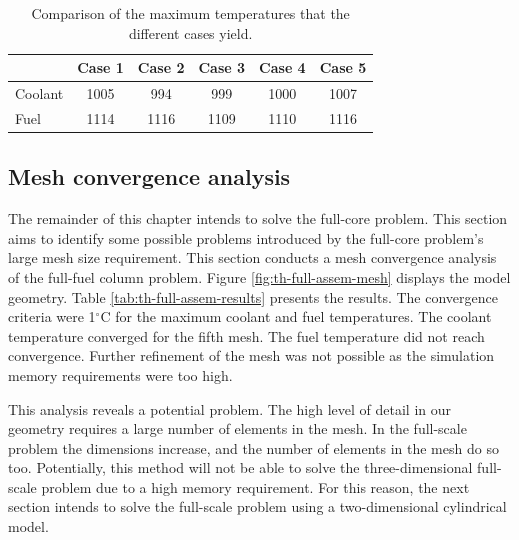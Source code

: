 \begin{table}[htbp!]
  \centering
  \caption{Comparison of the maximum temperatures that the different cases yield.}
  \label{tab:th-assem-flow-results}
\begin{tabular}{l|ccccc}
\toprule
        & Case 1 & Case 2 & Case 3 & Case 4 & Case 5 \\
\midrule
Coolant & 1005   &  994   &  999 & 1000 & 1007 \\
Fuel    & 1114   & 1116   & 1109 & 1110 & 1116 \\
\bottomrule
\end{tabular}
\end{table}

\subsection{Mesh convergence analysis}
\label{sec:meshconverge}

The remainder of this chapter intends to solve the full-core problem.
This section aims to identify some possible
problems introduced by the full-core problem's large mesh size requirement.
This section conducts a mesh convergence analysis of the full-fuel column problem.
Figure \ref{fig:th-full-assem-mesh} displays the model geometry.
Table \ref{tab:th-full-assem-results} presents the results.
The convergence criteria were 1$^{\circ}$C for the maximum coolant and fuel temperatures.
The coolant temperature converged for the fifth mesh.
The fuel temperature did not reach convergence.
Further refinement of the mesh was not possible as the simulation memory requirements were too high.

This analysis reveals a potential problem.
The high level of detail in our geometry requires a large number of elements in the mesh.
In the full-scale problem the dimensions increase, and the number of elements in the mesh do so too.
Potentially, this method will not be able to solve the three-dimensional full-scale problem due to a high memory requirement.
For this reason, the next section intends to solve the full-scale problem using a two-dimensional cylindrical model.


